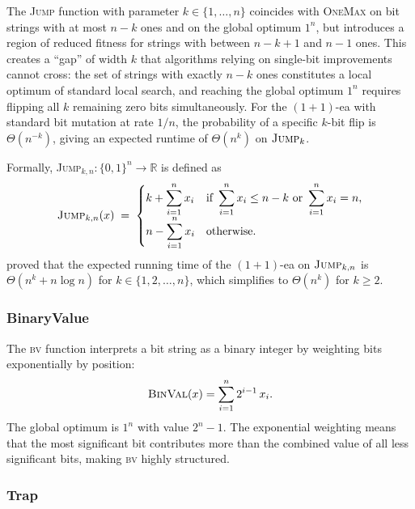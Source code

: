 The \textsc{Jump} function with parameter $k \in \{1, \ldots, n\}$
coincides with
\textsc{OneMax} on bit strings with at most $n - k$ ones and on the
global optimum
$1^n$, but introduces a region of reduced fitness for strings with
between $n-k+1$ and
$n-1$ ones. This creates a ``gap'' of width $k$ that algorithms
relying on single-bit
improvements cannot cross: the set of strings with exactly $n-k$ ones
constitutes a
local optimum of standard local search, and reaching the global
optimum $1^n$ requires
flipping all $k$ remaining zero bits simultaneously. For the
$(1+1)$-\acrshort{ea} with standard
bit mutation at rate $1/n$, the probability of a specific $k$-bit flip is
$\Theta(n^{-k})$, giving an expected runtime of $\Theta(n^k)$ on
$\textsc{Jump}_k$.

Formally, \textsc{Jump}$_{k,n} \colon \{0,1\}^n \to \mathbb{R}$ is defined as
\[
  \textsc{Jump}_{k,n}(x) \;=\;
  \begin{cases}
    k + \displaystyle\sum_{i=1}^{n} x_i & \text{if }
    \displaystyle\sum_{i=1}^{n} x_i \leq n - k
    \text{ or } \displaystyle\sum_{i=1}^{n} x_i = n, \\[8pt]
    n - \displaystyle\sum_{i=1}^{n} x_i & \text{otherwise.}
  \end{cases}
\]
\citet{droste2002analysis} proved that the
expected running
time of the $(1+1)$-\acrshort{ea} on $\textsc{Jump}_{k,n}$ is
$\Theta(n^k + n\log n)$ for
$k \in \{1, 2, \ldots, n\}$, which simplifies to $\Theta(n^k)$ for $k \geq 2$.

\subsubsection{BinaryValue}

The \textsc{\acrfull{bv}} function interprets a bit
string as a binary
integer by weighting bits exponentially by position:
\[
  \textsc{BinVal}(x) = \sum_{i=1}^{n} 2^{i-1}\, x_i.
\]
The global optimum is $1^n$ with value $2^n - 1$. The exponential
weighting means that
the most significant bit contributes more than the combined value of
all less significant
bits, making \textsc{\acrshort{bv}} highly structured.

\subsubsection{Trap}

